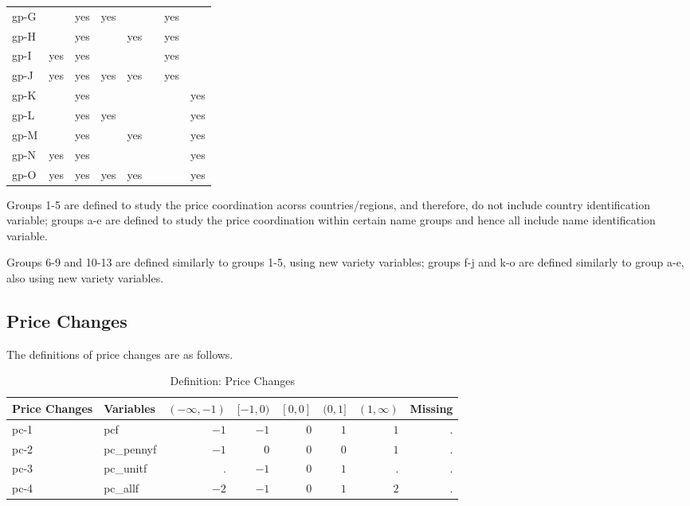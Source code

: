 \begin{table}[H]
\begin{tabular}{l|rrrrrrr}
		gp-G  &      &  yes &     yes &      &         &      yes &          \\
		gp-H  &      &  yes &         &  yes &         &      yes &          \\
		gp-I  &  yes &  yes &         &      &         &      yes &          \\
		gp-J  &  yes &  yes &     yes &  yes &         &      yes &          \\ \hline
		gp-K  &      &  yes &         &      &         &          &      yes \\
		gp-L  &      &  yes &     yes &      &         &          &      yes \\
		gp-M  &      &  yes &         &  yes &         &          &      yes \\
		gp-N  &  yes &  yes &         &      &         &          &      yes \\
		gp-O  &  yes &  yes &     yes &  yes &         &          &      yes \\ \hline\hline
	\end{tabular}
\end{table}

Groups 1-5 are defined to study the price coordination acorss countries/regions, and therefore, do not include country identification variable; groups a-e are defined to study the price coordination within certain name groups and hence all include name identification variable.

Groups 6-9 and 10-13 are defined similarly to groups 1-5, using new variety variables; groups f-j and k-o are defined similarly to group a-e, also using new variety variables.

\subsection{Price Changes}

The definitions of price changes are as follows.

\begin{table}[H]
	\caption{Definition: Price Changes}
	\begin{tabular}{l|l|rrrrrr}
		\hline\hline
		Price Changes & Variables  & $ (-\infty,-1) $ & $ [-1,0) $ & $ [0,0] $ & $ (0,1] $ & $ (1,\infty) $ & Missing \\ \hline\hline
		pc-1          & pcf        &           $ -1 $ &     $ -1 $ &     $ 0 $ &     $ 1 $ &          $ 1 $ &       . \\
		pc-2          & pc\_pennyf &           $ -1 $ &      $ 0 $ &     $ 0 $ &     $ 0 $ &          $ 1 $ &       . \\
		pc-3          & pc\_unitf  &                . &     $ -1 $ &     $ 0 $ &     $ 1 $ &              . &       . \\
		pc-4          & pc\_allf   &           $ -2 $ &     $ -1 $ &     $ 0 $ &     $ 1 $ &          $ 2 $ &       . \\ \hline\hline
	\end{tabular}
\end{table}

